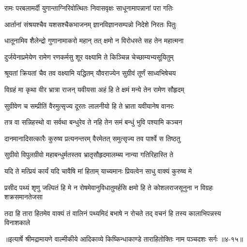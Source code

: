 \twolineshloka
{रामः परबलामर्दी युगान्ताग्निरिवोत्थितः}
{निवासवृक्षः साधूनामापन्नानां परा गतिः} %

\twolineshloka
{आर्तानां संश्रयश्चैव यशसश्चैकभाजनम्}
{ज्ञानविज्ञानसम्पन्नो निदेशे निरतः पितुः} %

\twolineshloka
{धातूनामिव शैलेन्द्रो गुणानामाकरो महान्}
{तत् क्षमो न विरोधस्ते सह तेन महात्मना} %

\twolineshloka
{दुर्जयेनाप्रमेयेण रामेण रणकर्मसु}
{शूर वक्ष्यामि ते किञ्चिन्न चेच्छाम्यभ्यसूयितुम्} %

\twolineshloka
{श्रूयतां क्रियतां चैव तव वक्ष्यामि यद्धितम्}
{यौवराज्येन सुग्रीवं तूर्णं साध्वभिषेचय} %

\twolineshloka
{विग्रहं मा कृथा वीर भ्रात्रा राजन् यवीयसा}
{अहं हि ते क्षमं मन्ये तेन रामेण सौहृदम्} %

\twolineshloka
{सुग्रीवेण च सम्प्रीतिं वैरमुत्सृज्य दूरतः}
{लालनीयो हि ते भ्राता यवीयानेष वानरः} %

\twolineshloka
{तत्र वा सन्निहस्थो वा सर्वथा बन्धुरेव ते}
{नहि तेन समं बन्धुं भुवि पश्यामि कञ्चन} %

\twolineshloka
{दानमानादिसत्कारैः कुरुष्व प्रत्यनन्तरम्}
{वैरमेतत् समुत्सृज्य तव पार्श्वे स तिष्ठतु} %

\twolineshloka
{सुग्रीवो विपुलग्रीवो महाबन्धुर्मतस्तव}
{भ्रातृसौहृदमालम्ब्य नान्या गतिरिहास्ति ते} %

\twolineshloka
{यदि ते मत्प्रियं कार्यं यदि चावैषि मां हिताम्}
{याच्यमानः प्रियत्वेन साधु वाक्यं कुरुष्व मे} %

\twolineshloka
{प्रसीद पथ्यं शृणु जल्पितं हि मे न रोषमेवानुविधातुमर्हसि}
{क्षमो हि ते कोशलराजसूनुना न विग्रहः शक्रसमानतेजसा} %

\twolineshloka
{तदा हि तारा हितमेव वाक्यं तं वालिनं पथ्यमिदं बभाषे}
{न रोचते तद् वचनं हि तस्य कालाभिपन्नस्य विनाशकाले} %


॥इत्यार्षे श्रीमद्रामायणे वाल्मीकीये आदिकाव्ये किष्किन्धाकाण्डे ताराहितोक्तिः नाम पञ्चदशः सर्गः ॥४-१५॥
